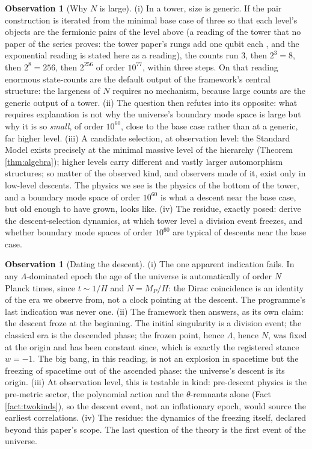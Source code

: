 \documentclass[11pt]{article}
\theoremstyle{definition}
\newtheorem{observation}[theorem]{Observation}
\begin{document}
\begin{observation}[Why $N$ is large]\label{obs:whylarge}
(i) In a tower, size is generic. If the pair construction is iterated from the minimal base case of three so that each level's objects are the fermionic pairs of the level above (a reading of the tower that no paper of the series proves: the tower paper's rungs add one qubit each \cite[Thm.~4.2]{ButlerT3}, and the exponential reading is stated here as a reading), the counts run $3$, then $2^{3} = 8$, then $2^{8} = 256$, then $2^{256}$ of order $10^{77}$, within three steps. On that reading enormous state-counts are the default output of the framework's central structure: the largeness of $N$ requires no mechanism, because large counts are the generic output of a tower. (ii) The question then refutes into its opposite: what requires explanation is not why the universe's boundary mode space is large but why it is so \emph{small}, of order $10^{60}$, close to the base case rather than at a generic, far higher level. (iii) A candidate selection, at observation level: the Standard Model exists precisely at the minimal massive level of the hierarchy (Theorem \ref{thm:algebra}); higher levels carry different and vastly larger automorphism structures; so matter of the observed kind, and observers made of it, exist only in low-level descents. The physics we see is the physics of the bottom of the tower, and a boundary mode space of order $10^{60}$ is what a descent near the base case, but old enough to have grown, looks like. (iv) The residue, exactly posed: derive the descent-selection dynamics, at which tower level a division event freezes, and whether boundary mode spaces of order $10^{60}$ are typical of descents near the base case.
\end{observation}

\begin{observation}[Dating the descent]\label{obs:dating}
(i) The one apparent indication fails. In any $\Lambda$-dominated epoch the age of the universe is automatically of order $N$ Planck times, since $t \sim 1/H$ and $N = M_{P}/H$: the Dirac coincidence is an identity of the era we observe from, not a clock pointing at the descent. The programme's last indication was never one. (ii) The framework then answers, as its own claim: the descent froze at the beginning. The initial singularity is a division event; the classical era is the descended phase; the frozen point, hence $\Lambda$, hence $N$, was fixed at the origin and has been constant since, which is exactly the registered stance $w = -1$. The big bang, in this reading, is not an explosion in spacetime but the freezing of spacetime out of the ascended phase: the universe's descent is its origin. (iii) At observation level, this is testable in kind: pre-descent physics is the pre-metric sector, the polynomial action and the $\theta$-remnants alone (Fact \ref{fact:twokinds}), so the descent event, not an inflationary epoch, would source the earliest correlations. (iv) The residue: the dynamics of the freezing itself, declared beyond this paper's scope. The last question of the theory is the first event of the universe.
\end{observation}
\end{document}
